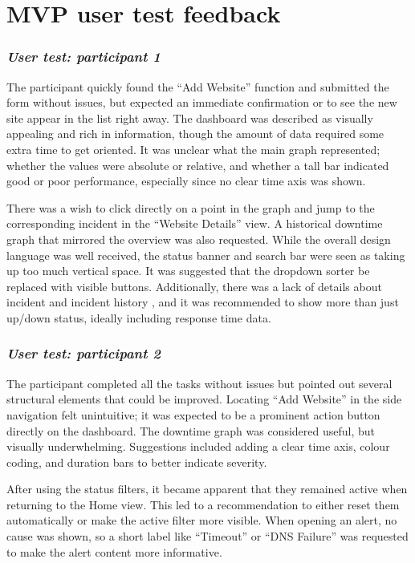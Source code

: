 \section{MVP user test feedback}
\label{app:mvp_user_test}

\subsubsection{\textit{\textbf{User test: participant 1}}}

The participant quickly found the “Add Website” function and submitted the form without issues, but expected an immediate confirmation or to see the new site appear in the list right away. The dashboard was described as visually appealing and rich in information, though the amount of data required some extra time to get oriented.  It was unclear what the main graph represented; whether the values were absolute or relative, and whether a tall bar indicated good or poor performance, especially since no clear time axis was shown. 

There was a wish to click directly on a point in the graph and jump to the corresponding incident in the “Website Details” view. A historical downtime graph that mirrored the overview was also requested. While the overall design language was well received, the status banner and search bar were seen as taking up too much vertical space. It was suggested that the dropdown sorter be replaced with visible buttons. Additionally, there was a lack of details about incident and incident history , and it was recommended to show more than just up/down status, ideally including response time data. 


\subsubsection{\textit{\textbf{User test: participant 2}}}

The participant completed all the tasks without issues but pointed out several structural elements that could be improved. Locating “Add Website” in the side navigation felt unintuitive; it was expected to be a prominent action button directly on the dashboard. The downtime graph was considered useful, but visually underwhelming. Suggestions included adding a clear time axis, colour coding, and duration bars to better indicate severity. 

After using the status filters, it became apparent that they remained active when returning to the Home view. This led to a recommendation to either reset them automatically or make the active filter more visible. When opening an alert, no cause was shown, so a short label like “Timeout” or “DNS Failure” was requested to make the alert content more informative.

